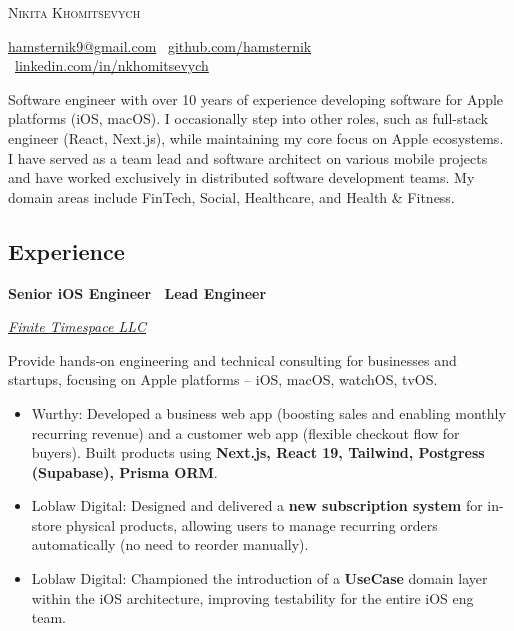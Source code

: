 \documentclass[10pt]{article}
\newcommand{\SectionSpacing}{ %
    \vspace*{1em}
}
\newcommand{\SubSectionSpacing}{
    \vspace*{0.5em}
}
\newcommand{\Experience}[3]{%
    \noindent \textbf{#1}
    \hfill \text{#2} \par
    \noindent \textit{#3} \par
    \normalsize \normalfont \par
}
\begin{document}
\textsc{\huge{Nikita Khomitsevych}}

\SectionSpacing

\noindent
\href{mailto:hamsternik9@gmail.com}{hamsternik9@gmail.com} \textbar\
\href{https://github.com/hamsternik}{github.com/hamsternik} \textbar\
\href{https://www.linkedin.com/in/nkhomitsevych/}{linkedin.com/in/nkhomitsevych}

\SectionSpacing

\noindent
Software engineer with over 10 years of experience developing software for Apple platforms (iOS, macOS). 
I occasionally step into other roles, such as full-stack engineer (React, Next.js), while maintaining my core focus on Apple ecosystems. 
I have served as a team lead and software architect on various mobile projects and have worked exclusively in distributed software development teams. 
My domain areas include FinTech, Social, Healthcare, and Health \& Fitness.


\subsection*{Experience}

\Experience
{Senior iOS Engineer \textbar\ Lead Engineer}
{Dec 2023 — Oct 2025}
{\href{https://finitetimespace.com}{Finite Timespace LLC}}

\noindent
Provide hands‑on engineering and technical consulting for businesses and startups,
  focusing on Apple platforms -- iOS, macOS, watchOS, tvOS.

\noindent
\begin{itemize}[label=-]
  \setlength\itemsep{0cm}
\item Wurthy: Developed a business web app (boosting sales and enabling monthly recurring revenue)
  and a customer web app (flexible checkout flow for buyers). Built products using
  \textbf{Next.js, React 19, Tailwind, Postgress (Supabase), Prisma ORM}.
\item Loblaw Digital: Designed and delivered a \textbf{new subscription system} for in-store physical products,
  allowing users to manage recurring orders automatically (no need to reorder manually).
\item Loblaw Digital: Championed the introduction of a \textbf{UseCase} domain layer within the iOS architecture,
  improving testability for the entire iOS eng team.
\end{itemize}

\SubSectionSpacing
\end{document}
